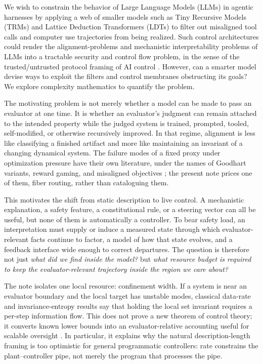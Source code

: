 \documentclass[11pt]{article}
\theoremstyle{definition}
\theoremstyle{remark}
\begin{document}
We wish to constrain the behavior of Large Language Models (LLMs) in agentic harnesses by applying a web of smaller models such as Tiny Recursive Models (TRMs) and Lattice Deduction Transformers (LDTs) \cite{jolicoeur2025,wang2025hrm,davis2026ldt,dugan2026trmldt} to filter out misaligned tool calls and computer use trajectories from being realized. Such control architectures could render the alignment-problems and mechanistic interpretability problems of LLMs into a tractable security and control flow problem, in the sense of the trusted/untrusted protocol framing of AI control \cite{greenblatt2023}. However, can a smarter model devise ways to exploit the filters and control membranes obstructing its goals? We explore complexity mathematics to quantify the problem.

The motivating problem is not merely whether a model can be made to pass an evaluator at one time. It is whether an evaluator's judgment can remain attached to the intended property while the judged system is trained, prompted, tooled, self-modified, or otherwise recursively improved. In that regime, alignment is less like classifying a finished artifact and more like maintaining an invariant of a changing dynamical system. The failure modes of a fixed proxy under optimization pressure have their own literature, under the names of Goodhart variants, reward gaming, and misaligned objectives \cite{manheim2018,skalse2022,zhuang2020}; the present note prices one of them, fiber routing, rather than cataloguing them.

This motivates the shift from static description to live control. A mechanistic explanation, a safety feature, a constitutional rule, or a steering vector can all be useful, but none of them is automatically a controller. To bear safety load, an interpretation must supply or induce a measured state through which evaluator-relevant facts continue to factor, a model of how that state evolves, and a feedback interface wide enough to correct departures. The question is therefore not just \emph{what did we find inside the model?} but \emph{what resource budget is required to keep the evaluator-relevant trajectory inside the region we care about?}

The note isolates one local resource: confinement width. If a system is near an evaluator boundary and the local target has unstable modes, classical data-rate and invariance-entropy results say that holding the local set invariant requires a per-step information flow. This does not prove a new theorem of control theory; it converts known lower bounds into an evaluator-relative accounting useful for scalable oversight \cite{christiano2018,irving2018,bowman2022}. In particular, it explains why the natural description-length framing is too optimistic for general programmatic controllers: rate constrains the plant--controller pipe, not merely the program that processes the pipe.
\end{document}
